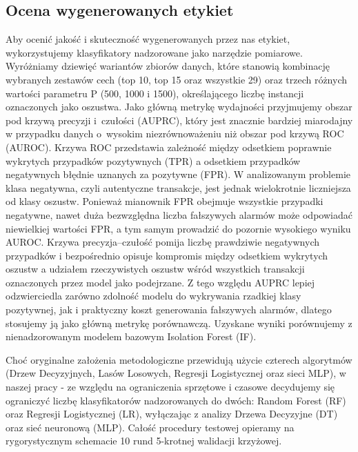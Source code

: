 \documentclass [runningheads]{llncs}
\begin{document}
\subsection*{Ocena wygenerowanych etykiet}
Aby ocenić jakość i skuteczność wygenerowanych przez nas etykiet, wykorzystujemy klasyfikatory nadzorowane jako narzędzie pomiarowe.
Wyróżniamy dziewięć wariantów zbiorów danych, które stanowią kombinację wybranych zestawów cech (top 10, top 15 oraz wszystkie 29) oraz trzech różnych wartości parametru P (500, 1000 i 1500), określającego liczbę instancji oznaczonych jako oszustwa.
Jako główną metrykę wydajności przyjmujemy obszar pod krzywą precyzji i~czułości (AUPRC), który jest znacznie bardziej miarodajny w przypadku danych o~wysokim niezrównoważeniu niż obszar pod krzywą ROC (AUROC).
Krzywa ROC przedstawia zależność między odsetkiem poprawnie wykrytych przypadków pozytywnych (TPR) a odsetkiem przypadków negatywnych błędnie uznanych za pozytywne (FPR).
W analizowanym problemie klasa negatywna, czyli autentyczne transakcje, jest jednak wielokrotnie liczniejsza od klasy oszustw.
Ponieważ mianownik FPR obejmuje wszystkie przypadki negatywne, nawet duża bezwzględna liczba fałszywych alarmów może odpowiadać niewielkiej wartości FPR, a tym samym prowadzić do pozornie wysokiego wyniku AUROC.
Krzywa precyzja--czułość pomija liczbę prawdziwie negatywnych przypadków i bezpośrednio opisuje kompromis między odsetkiem wykrytych oszustw a udziałem rzeczywistych oszustw wśród wszystkich transakcji oznaczonych przez model jako podejrzane.
Z tego względu AUPRC lepiej odzwierciedla zarówno zdolność modelu do wykrywania rzadkiej klasy pozytywnej, jak i praktyczny koszt generowania fałszywych alarmów, dlatego stosujemy ją jako główną metrykę porównawczą.
Uzyskane wyniki porównujemy z nienadzorowanym modelem bazowym Isolation Forest (IF).

Choć oryginalne założenia metodologiczne przewidują użycie czterech algorytmów (Drzew Decyzyjnych, Lasów Losowych, Regresji Logistycznej oraz sieci MLP), 
w naszej pracy - ze względu na ograniczenia sprzętowe i czasowe decydujemy się ograniczyć liczbę klasyfikatorów nadzorowanych do dwóch: Random Forest (RF)\cite{article-random-forests} oraz Regresji Logistycznej (LR), wyłączając z analizy Drzewa Decyzyjne (DT) oraz sieć neuronową (MLP).
Całość procedury testowej opieramy na rygorystycznym schemacie 10 rund 5-krotnej walidacji krzyżowej.
\end{document}

